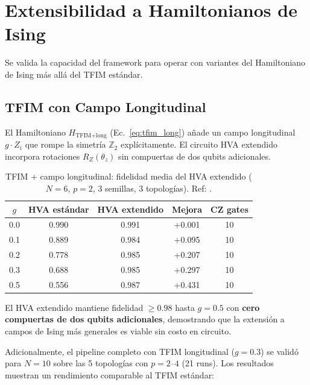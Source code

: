 \documentclass[11pt,a4paper,spanish]{book}
\begin{document}
\section{Extensibilidad a Hamiltonianos de Ising}

Se valida la capacidad del framework para operar con variantes del Hamiltoniano de Ising más allá del TFIM estándar.

\subsection{TFIM con Campo Longitudinal}

El Hamiltoniano $H_{\text{TFIM+long}}$ (Ec.~\ref{eq:tfim_long}) añade un campo longitudinal $g \cdot Z_i$ que rompe la simetría $\mathbb{Z}_2$ explícitamente. El circuito HVA extendido incorpora rotaciones $R_Z(\theta_z)$ sin compuertas de dos qubits adicionales.

\begin{table}[h]
\centering
\caption{TFIM + campo longitudinal: fidelidad media del HVA extendido ($N = 6$, $p = 2$, 3 semillas, 3 topologías). Ref: \citet{dutta2015}.}
\label{tab:tfim_long}
\begin{tabular}{ccccc}
\toprule
\textbf{$g$} & \textbf{HVA estándar} & \textbf{HVA extendido} & \textbf{Mejora} & \textbf{CZ gates} \\
\midrule
0.0 & 0.990 & 0.991 & +0.001 & 10 \\
0.1 & 0.889 & 0.984 & +0.095 & 10 \\
0.2 & 0.778 & 0.985 & +0.207 & 10 \\
0.3 & 0.688 & 0.985 & +0.297 & 10 \\
0.5 & 0.556 & 0.987 & +0.431 & 10 \\
\bottomrule
\end{tabular}
\end{table}

El HVA extendido mantiene fidelidad $\geq 0.98$ hasta $g = 0.5$ con \textbf{cero compuertas de dos qubits adicionales}, demostrando que la extensión a campos de Ising más generales es viable sin costo en circuito.

Adicionalmente, el pipeline completo con TFIM longitudinal ($g = 0.3$) se validó para $N = 10$ sobre las 5 topologías con $p = 2$--$4$ (21 runs). Los resultados muestran un rendimiento comparable al TFIM estándar:
\end{document}
